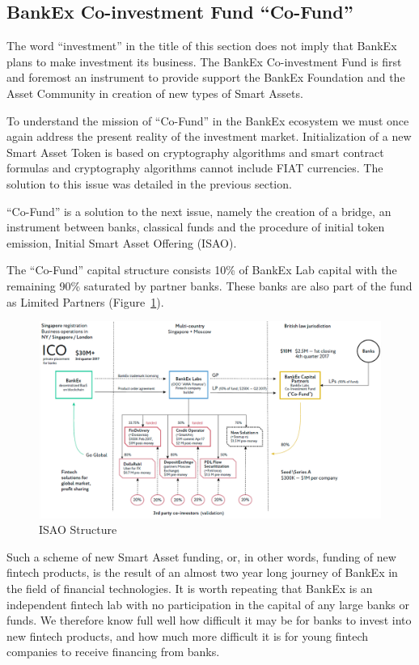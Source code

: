 \documentclass{article}
\begin{document}
\begin{multicols}{2}
\subsection{BankEx Co-investment Fund \enquote{Co-Fund}}

The word \enquote{investment} in the title of this section does not imply that BankEx plans to make investment its business. The BankEx Co-investment Fund is first and foremost an instrument to provide support the BankEx Foundation and the Asset Community in creation of new types of Smart Assets.

To understand the mission of \enquote{Co-Fund} in the BankEx ecosystem we must once again address the present reality of the investment market. Initialization of a new Smart Asset Token is based on cryptography algorithms and smart contract formulas and cryptography algorithms cannot include FIAT currencies. The solution to this issue was detailed in the previous section.

\enquote{Co-Fund} is a solution to the next issue, namely the creation of a bridge, an instrument between banks, classical funds and the procedure of initial token emission, Initial Smart Asset Offering (ISAO).

The \enquote{Co-Fund} capital structure consists 10\% of BankEx Lab capital with the remaining 90\% saturated by partner banks. These banks are also part of the fund as Limited Partners (Figure~\ref{fig:co-fund}).

\begin{figure}
  \centering
  \includegraphics[width=\textwidth]{co-fund}
  \caption{ISAO Structure}
  \label{fig:co-fund}
\end{figure}

Such a scheme of new Smart Asset funding, or, in other words, funding of new fintech products, is the result of an almost two year long journey of BankEx in the field of financial technologies. It is worth repeating that BankEx is an independent fintech lab with no participation in the capital of any large banks or funds. We therefore know full well how difficult it may be for banks to invest into new fintech products, and how much more difficult it is for young fintech companies to receive financing from banks. 


\end{multicols}
\end{document}
